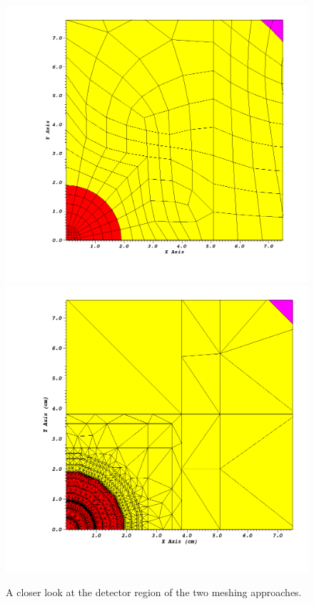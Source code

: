 \documentclass[11pt, letterpaper,titlepage,oneside]{article}
\begin{document}
\begin{figure}[H]
\centering
  \includegraphics[scale=0.17]{../figures/im1_cubit_slice_zoom.png}
  \includegraphics[scale=0.17]{../figures/im1c_prism_slice_zoom_q.png}
  \caption{A closer look at the detector region of the two meshing approaches.}
  \label{comparison_slice_zoom}
\end{figure}
\end{document}
